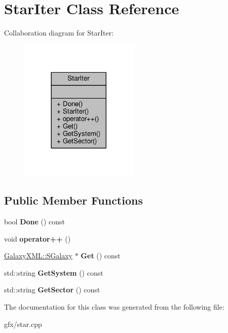 \hypertarget{classStarIter}{}\section{Star\+Iter Class Reference}
\label{classStarIter}


Collaboration diagram for Star\+Iter\+:
\nopagebreak
\begin{figure}[H]
\begin{center}
\leavevmode
\includegraphics[width=161pt]{dc/d28/classStarIter__coll__graph}
\end{center}
\end{figure}
\subsection*{Public Member Functions}
\begin{DoxyCompactItemize}
\item 
bool {\bfseries Done} () const \hypertarget{classStarIter_a7df93869c59215aafc249473a03fd166}{}\label{classStarIter_a7df93869c59215aafc249473a03fd166}

\item 
void {\bfseries operator++} ()\hypertarget{classStarIter_a74cb227534ac4f026ccf1a1f931f0f9f}{}\label{classStarIter_a74cb227534ac4f026ccf1a1f931f0f9f}

\item 
\hyperlink{classGalaxyXML_1_1SGalaxy}{Galaxy\+X\+M\+L\+::\+S\+Galaxy} $\ast$ {\bfseries Get} () const \hypertarget{classStarIter_a42ca0c2028d831bf7c1af23409303aef}{}\label{classStarIter_a42ca0c2028d831bf7c1af23409303aef}

\item 
std\+::string {\bfseries Get\+System} () const \hypertarget{classStarIter_ae40fcd1838e81cc0fee0275362c8b701}{}\label{classStarIter_ae40fcd1838e81cc0fee0275362c8b701}

\item 
std\+::string {\bfseries Get\+Sector} () const \hypertarget{classStarIter_a2f89393bd6115ef77f77589bcadbf1b0}{}\label{classStarIter_a2f89393bd6115ef77f77589bcadbf1b0}

\end{DoxyCompactItemize}


The documentation for this class was generated from the following file\+:\begin{DoxyCompactItemize}
\item 
gfx/star.\+cpp\end{DoxyCompactItemize}
